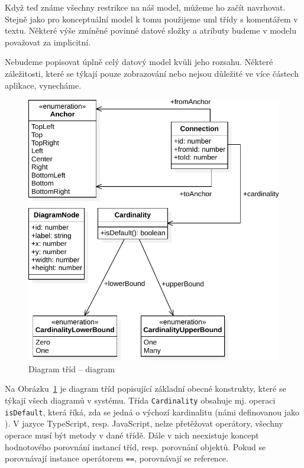 Když teď známe všechny restrikce na náš model, můžeme ho začít navrhovat.
Stejně jako pro konceptuální model k tomu použijeme \acrshort{uml} třídy s komentářem v textu.
Některé výše zmíněné povinné datové složky a atributy budeme v modelu považovat za implicitní.

Nebudeme popisovat úplně celý datový model kvůli jeho rozsahu.
Některé záležitosti, které se týkají pouze zobrazování nebo nejsou důležité ve více částech aplikace, vynecháme.

\begin{figure}[!htb]
  \centering
  \includegraphics[width=\maxwidth{\textwidth}]{../img/diagrams/diagram-class-diagram.pdf}
  \caption{Diagram tříd -- diagram}
  \label{fig:diagram-class-diagram}
\end{figure}

Na Obrázku~\ref{fig:diagram-class-diagram} je diagram tříd popisující základní obecné konstrukty, které se týkají všech diagramů v systému.
Třída \texttt{Cardinality} obsahuje mj. operaci \texttt{isDefault}, která říká, zda se jedná o výchozí kardinalitu (námi definovanou jako \oneone).
V jazyce TypeScript, resp. JavaScript, nelze přetěžovat operátory, všechny operace musí být metody v dané třídě.
Dále v nich neexistuje koncept hodnotového porovnání instancí tříd, resp. porovnání objektů.
Pokud se porovnávají instance operátorem \texttt{==}, porovnávají se reference.

